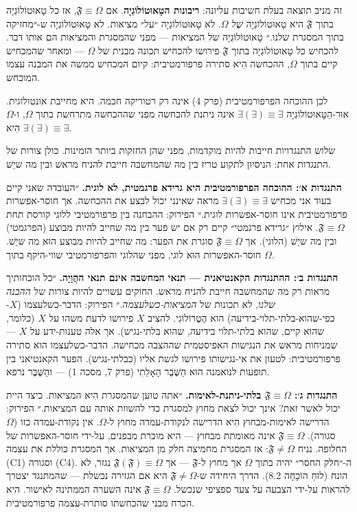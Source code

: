 \documentclass[10pt, openany, oneside]{book}
\begin{document}
זה מניב תוצאה בעלת חשיבות עליונה: \textbf{ריבונות הטָאוּטוֹלוֹגְיָה}. אם $\mathfrak{F} \equiv \Omega$, אז כל טָאוּטוֹלוֹגְיָה בתוך $\mathfrak{F}$ היא טָאוּטוֹלוֹגְיָה \textit{שֶׁל} $\Omega$. לא טָאוּטוֹלוֹגְיָה ״על״ מציאות. לא טָאוּטוֹלוֹגְיָה ש-״מחזיקה בתוך המסגרת שלנו.״ טָאוּטוֹלוֹגְיָה של המציאות — מפני שהמסגרת והמציאות הם אותו דבר. להכחיש כל טָאוּטוֹלוֹגְיָה בתוך $\mathfrak{F}$ פירושו להכחיש תכונה מבנית של $\Omega$ — ומאחר שהמכחיש קיים בתוך $\Omega$, ההכחשה הִיא סתירה פרפורמטיבית: קיום המכחיש ממשה את המבנה עצמו המוכחש.

לכן ההוכחה הפרפורמטיבית (פרק 4) אינה רק רטוריקה חכמה. היא מחייבת אונטולוגית. אוּר-הַטָּאוּטוֹלוֹגְיָה $\exists(\exists) \equiv \exists$ אינה ניתנת להכחשה מפני שההכחשה מתרחשת בתוך $\Omega$, ו-$\Omega$ הִיא $\exists(\exists) \equiv \exists$.

שלוש התנגדויות חייבות להיות מוקדמות, מפני שהן החזקות ביותר הזמינות. כולן צורות של התנגדות אחת: הניסיון לתקוע טריז בין מה שהמחשבה חייבת להניח מראש ובין מה שיֵשׁ.

\textbf{התנגדות א׳: ההוכחה הפרפורמטיבית היא גרידא פרגמטית, לא לוגית.} ״העובדה שאני קיים בעוד אני מכחיש $\exists(\exists) \equiv \exists$ מראה שאינני יכול לבצע את ההכחשה. אך חוסר-אפשרות פרפורמטיבית אינו חוסר-אפשרות לוגית.״ הפירוק: ההבחנה בין פרפורמטיבי ללוגי קורסת תחת $\mathfrak{F} \equiv \Omega$. אילוץ ״גרידא פרגמטי״ קיים רק אם יש פער בין מה שחייב להיות מבוצע (הפרגמטי) ובין מה שיֵשׁ (הלוגי). אך $\mathfrak{F} \equiv \Omega$ סוגרת את הפער: מה שחייב להיות מבוצע הוּא מה שיֵשׁ. חוסר-האפשרות הוּא לוגי, מפני שהלוגי והפרפורמטיבי שווי-היקף בתוך $\Omega$.

\textbf{התנגדות ב׳: ההתנגדות הקאנטיאנית — תנאי המחשבה אינם תנאי ההֲוָיָה.} ״כל הוכחותיך מראות רק מה שהמחשבה חייבת להניח מראש. החוקים עשויים להיות צורות של \textit{ההבנה שלנו}, לא תכונות של \textit{המציאות-כשלעצמה}.״ הפירוק: הדבר-כשלעצמו ($X$-כפי-שהוא-בלתי-תלוי-בידיעה) הוא הֶטֶרוֹלוֹגִי. להציב $X$ פירושו לדעת משהו על $X$ (כלומר, שהוא קיים, שהוא בלתי-תלוי בידיעה, שהוא בלתי-נגיש). אך אלה טענות-ידע על $X$ — שמניחות מראש את הנגישות האפיסטמית שההצבה מכחישה. הדבר-כשלעצמו הוא סתירה פרפורמטיבית: לטעון את אי-נגישותו פירושו לגשת אליו (כבלתי-נגיש). הפער הקאנטיאני בין תופעות לנואמנה הוּא הַשֶּׁבֶר הָאָלֵתִי (פרק 7, מסכה 1) — והַשֶּׁבֶר נרפא.

\textbf{התנגדות ג׳: $\mathfrak{F} \equiv \Omega$ בלתי-ניתנת-לאימות.} ״אתה טוען שהמסגרת הִיא המציאות. כיצד היית יכול לאשר זאת? אינך יכול לצאת מחוץ למסגרת כדי להשוות אותה עם המציאות.״ הפירוק: הדרישה לאימות-מבחוץ הִיא הדרישה לנקודת-עמדה מחוץ ל-$\Omega$. אין נקודת-עמדה כזו ($\Omega$ סגורה). $\mathfrak{F} \equiv \Omega$ אינה מאומתת מבחוץ — היא מוכרת מבפנים, על-ידי חוסר-האפשרות של החלופה. נניח $\mathfrak{F} \neq \Omega$: אז המסגרת מחמיצה חלק מן המציאות. אך המסגרת כוללת את עצמה (C1) וסגורה (C4). ה-״חלק החסר״ יהיה בתוך $\Omega$ אך מחוץ ל-$\mathfrak{F}$ — אך $\mathfrak{F}(\mathfrak{F}) \equiv \Omega$ נגזר, לא הונח (לוּחַ הוֹכָחָה 8.2). הדרך היחידה ש-$\mathfrak{F} \neq \Omega$ היא אם הגזירה נכשלת — שהמתנגד יצטרך להראות על-ידי הצבעה על צעד ספציפי שנכשל. $\mathfrak{F} \equiv \Omega$ אינה השערה הממתינה לאישור. היא הכרח מבני שהכחשתו סותרת-עצמה פרפורמטיבית.
\end{document}
